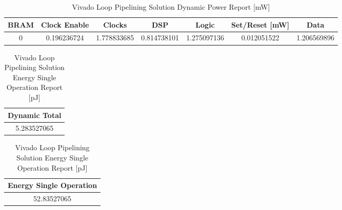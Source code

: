 \begin{table}[H]
    \centering
    \begin{tabular}{|c|c|c|c|c|c|c|}
        \hline
        \textbf{BRAM} & \textbf{Clock Enable} & \textbf{Clocks} & \textbf{DSP} & \textbf{Logic} & \textbf{Set/Reset} [mW] & \textbf{Data} \\
        \hline
        0 & 0.196236724 & 1.778833685 & 0.814738101 & 1.275097136 & 0.012051522 & 1.206569896 \\
        \hline
    \end{tabular}
    \caption{Vivado Loop Pipelining Solution Dynamic Power Report [mW]}
    \label{tab:vivado-loop-pipelining-solution-dynamic-power-report}
\end{table}

\begin{table}[H]
    \centering
    \begin{minipage}[t]{0.45\linewidth}
        \centering
        \begin{tabular}{|c|}
            \hline
            \textbf{Dynamic Total} \\
            \hline
            5.283527065 \\
            \hline
        \end{tabular}
        \caption{Vivado Loop Pipelining Solution Dynamic Power Report [mW]}
        \label{tab:vivado-loop-pipelining-solution-total-dynamic-power-report}
    \end{minipage}
    \hfill
    \centering
    \begin{minipage}[t]{0.45\linewidth}
        \centering
        \begin{tabular}{|c|}
            \hline
            \textbf{Energy Single Operation} \\
            \hline
            52.83527065 \\
            \hline
        \end{tabular}
        \caption{Vivado Loop Pipelining Solution Energy Single Operation Report [pJ]}
        \label{tab:vivado-loop-pipelining-solution-energy-single-operation-report}
    \end{minipage}
\end{table}
